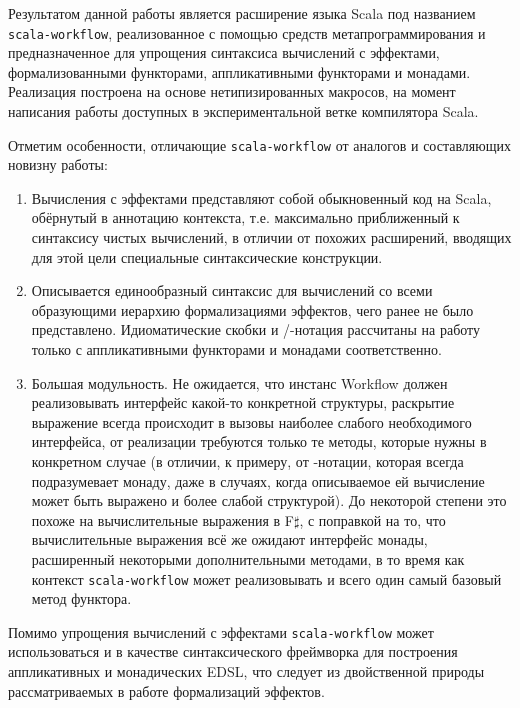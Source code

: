 Результатом данной работы является расширение языка Scala под названием \texttt{scala-workflow}, реализованное с помощью средств метапрограммирования и предназначенное для упрощения синтаксиса вычислений с эффектами, формализованными функторами, аппликативными функторами и монадами. Реализация построена на основе нетипизированных макросов, на момент написания работы доступных в экспериментальной ветке компилятора Scala.

Отметим особенности, отличающие \texttt{scala-workflow} от аналогов и составляющих новизну работы:
\begin{enumerate}
  \item Вычисления с эффектами представляют собой обыкновенный код на Scala, обёрнутый в аннотацию контекста, т.е. максимально приближенный к синтаксису чистых вычислений, в отличии от похожих расширений, вводящих для этой цели специальные синтаксические конструкции.
  \item Описывается единообразный синтаксис для вычислений со всеми образующими иерархию формализациями эффектов, чего ранее не было представлено. Идиоматические скобки и \<\>/\<\>-нотация рассчитаны на работу только с аппликативными функторами и монадами соответственно.
  \item Большая модульность. Не ожидается, что инстанс \<Workflow\> должен реализовывать интерфейс какой-то конкретной структуры, раскрытие выражение всегда происходит в вызовы наиболее слабого необходимого интерфейса, от реализации требуются только те методы, которые нужны в конкретном случае (в отличии, к примеру, от \<\>-нотации, которая всегда подразумевает монаду, даже в случаях, когда описываемое ей вычисление может быть выражено и более слабой структурой). До некоторой степени это похоже на вычислительные выражения в F$\sharp$, с поправкой на то, что вычислительные выражения всё же ожидают интерфейс монады, расширенный некоторыми дополнительными методами, в то время как контекст \texttt{scala-workflow} может реализовывать и всего один самый базовый метод функтора.
\end{enumerate}

Помимо упрощения вычислений с эффектами \texttt{scala-workflow} может использоваться и в качестве синтаксического фреймворка для построения аппликативных и монадических EDSL, что следует из двойственной природы рассматриваемых в работе формализаций эффектов.

